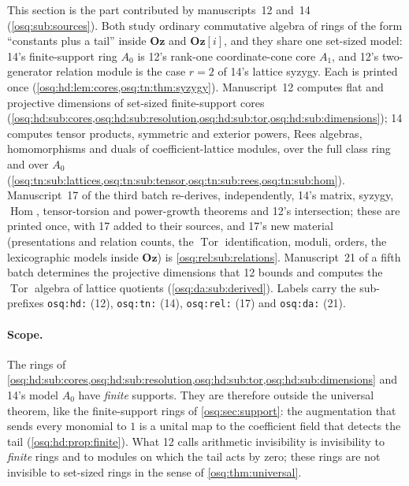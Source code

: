 \documentclass[11pt,letterpaper]{article}
\numberwithin{equation}{section}
\theoremstyle{definition}
\theoremstyle{remark}
\theoremstyle{plain}
\newcommand{\Oz}{\mathbf{Oz}}
\newcommand{\GOz}{\Oz[i]}
\newcommand{\Hom}{\operatorname{Hom}}
\newcommand{\Tor}{\operatorname{Tor}}
\begin{document}
This section is the part contributed by manuscripts~12 and~14 (\cref{osq:sub:sources}). Both
study ordinary commutative algebra of rings of the form ``constants plus a tail'' inside $\Oz$ and
$\GOz$, and they share one set-sized model: 14's finite-support ring $A_0$ is 12's rank-one
coordinate-cone core $A_1$, and 12's two-generator relation module is the case $r=2$ of 14's
lattice syzygy. Each is printed once (\cref{osq:hd:lem:cores,osq:tn:thm:syzygy}). Manuscript~12
computes flat and projective dimensions of set-sized finite-support cores
(\cref{osq:hd:sub:cores,osq:hd:sub:resolution,osq:hd:sub:tor,osq:hd:sub:dimensions}); 14 computes
tensor products, symmetric and exterior powers, Rees algebras, homomorphisms and duals of
coefficient-lattice modules, over the full class ring and over $A_0$
(\cref{osq:tn:sub:lattices,osq:tn:sub:tensor,osq:tn:sub:rees,osq:tn:sub:hom}). Manuscript~17 of the third batch
re-derives, independently, 14's matrix, syzygy, $\Hom$, tensor-torsion and power-growth theorems and 12's intersection;
these are printed once, with 17 added to their sources, and 17's new material (presentations and relation counts, the
$\Tor$ identification, moduli, orders, the lexicographic models inside $\Oz$) is \cref{osq:rel:sub:relations}. Manuscript~21 of a
fifth batch determines the projective dimensions that 12 bounds and computes the $\Tor$ algebra of lattice quotients
(\cref{osq:da:sub:derived}). Labels carry the sub-prefixes \texttt{osq:hd:} (12), \texttt{osq:tn:} (14), \texttt{osq:rel:} (17) and
\texttt{osq:da:} (21).

\paragraph{Scope.} The rings of \cref{osq:hd:sub:cores,osq:hd:sub:resolution,osq:hd:sub:tor,osq:hd:sub:dimensions}
and 14's model $A_0$ have \emph{finite} supports. They are therefore outside the universal theorem, like
the finite-support rings of \cref{osq:sec:support}: the augmentation that sends every monomial to $1$
is a unital map to the coefficient field that detects the tail (\cref{osq:hd:prop:finite}). What 12
calls arithmetic invisibility is invisibility to \emph{finite} rings and to modules on which the tail
acts by zero; these rings are not invisible to set-sized rings in the sense of \cref{osq:thm:universal}.
\end{document}
